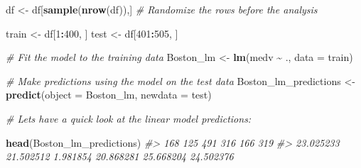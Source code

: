 \documentclass[
]{book}
\newenvironment{Shaded}{\begin{snugshade}}{\end{snugshade}}
\newcommand{\AttributeTok}[1]{\textcolor[rgb]{0.13,0.29,0.53}{#1}}
\newcommand{\CommentTok}[1]{\textcolor[rgb]{0.56,0.35,0.01}{\textit{#1}}}
\newcommand{\DecValTok}[1]{\textcolor[rgb]{0.00,0.00,0.81}{#1}}
\newcommand{\FunctionTok}[1]{\textcolor[rgb]{0.13,0.29,0.53}{\textbf{#1}}}
\newcommand{\NormalTok}[1]{#1}
\newcommand{\OtherTok}[1]{\textcolor[rgb]{0.56,0.35,0.01}{#1}}
\newcommand{\SpecialCharTok}[1]{\textcolor[rgb]{0.81,0.36,0.00}{\textbf{#1}}}
\begin{document}
\begin{Shaded}
\begin{Highlighting}[]
\NormalTok{df }\OtherTok{\textless{}{-}}\NormalTok{ df[}\FunctionTok{sample}\NormalTok{(}\FunctionTok{nrow}\NormalTok{(df)),] }\CommentTok{\# Randomize the rows before the analysis}

\NormalTok{train }\OtherTok{\textless{}{-}}\NormalTok{ df[}\DecValTok{1}\SpecialCharTok{:}\DecValTok{400}\NormalTok{, ]}
\NormalTok{test }\OtherTok{\textless{}{-}}\NormalTok{ df[}\DecValTok{401}\SpecialCharTok{:}\DecValTok{505}\NormalTok{, ]}

\CommentTok{\# Fit the model to the training data}
\NormalTok{Boston\_lm }\OtherTok{\textless{}{-}} \FunctionTok{lm}\NormalTok{(medv }\SpecialCharTok{\textasciitilde{}}\NormalTok{ ., }\AttributeTok{data =}\NormalTok{ train)}

\CommentTok{\# Make predictions using the model on the test data}
\NormalTok{Boston\_lm\_predictions }\OtherTok{\textless{}{-}} \FunctionTok{predict}\NormalTok{(}\AttributeTok{object =}\NormalTok{ Boston\_lm, }\AttributeTok{newdata =}\NormalTok{ test)}

\CommentTok{\# Let\textquotesingle{}s have a quick look at the linear model predictions:}

\FunctionTok{head}\NormalTok{(Boston\_lm\_predictions)}
\CommentTok{\#\textgreater{}       168       125       491       316       166       319 }
\CommentTok{\#\textgreater{} 23.025233 21.502512  1.981854 20.868281 25.668204 24.502376}
\end{Highlighting}
\end{Shaded}

\begin{Shaded}
\end{Shaded}
\end{document}
